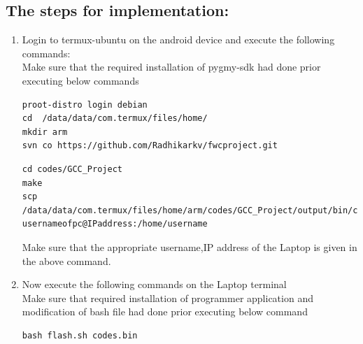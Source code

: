 \documentclass[10pt, a4paper]{article}
\begin{document}
\subsection{The steps for implementation:}
\begin{enumerate}
\item Login to termux-ubuntu on the android device and execute the following commands:\\
Make sure that the required installation of pygmy-sdk had done prior executing below commands
\begin{lstlisting}
proot-distro login debian
cd  /data/data/com.termux/files/home/
mkdir arm
svn co https://github.com/Radhikarkv/fwcproject.git
\end{lstlisting}
\begin{lstlisting}
cd codes/GCC_Project
make
scp /data/data/com.termux/files/home/arm/codes/GCC_Project/output/bin/codes.bin usernameofpc@IPaddress:/home/username
\end{lstlisting}
Make sure that the appropriate username,IP address of the Laptop is given in the above command.
\item Now execute the following commands on the Laptop terminal\\
Make sure that required installation of programmer application and modification of bash file had done prior executing below command
\begin{lstlisting}
bash flash.sh codes.bin
\end{lstlisting}
\end{enumerate}
\end{document}
